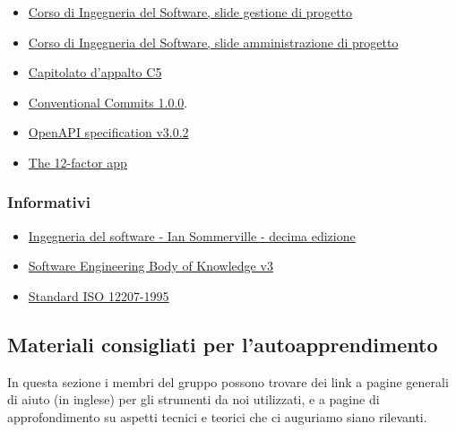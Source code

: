 \documentclass[../norme-di-progetto.tex]{subfiles}
\begin{document}
\begin{itemize}
  \item \href{https://www.math.unipd.it/~tullio/IS-1/2019/Dispense/L06.pdf}{Corso di Ingegneria del Software, slide gestione di progetto}
  \item \href{https://www.math.unipd.it/~tullio/IS-1/2019/Dispense/FC01.pdf}{Corso di Ingegneria del Software, slide amministrazione di progetto}
  \item \href{https://www.math.unipd.it/~tullio/IS-1/2019/Progetto/C5.pdf}{Capitolato d'appalto C5}
  \item \href{https://www.conventionalcommits.org/en/v1.0.0/}{Conventional Commits 1.0.0}.
  \item \href{https://spec.openapis.org/oas/v3.0.2}{OpenAPI specification v3.0.2}
  \item \href{https://12factor.net/}{The 12-factor app}
\end{itemize}

\subsubsection{Informativi}%
\label{subs:riferimenti/informativi}

\begin{itemize}
  \item \href{https://www.pearson.it/opera/pearson/0-6424-ingegneria_del_software}{Ingegneria del software - Ian Sommerville - decima edizione}
  \item \href{https://www.computer.org/education/bodies-of-knowledge/software-engineering/v3}{Software Engineering Body of Knowledge v3}
  \item \href{https://www.math.unipd.it/~tullio/IS-1/2009/Approfondimenti/ISO_12207-1995.pdf}{Standard ISO 12207-1995}
\end{itemize}

\subsection{Materiali consigliati per l'autoapprendimento}%
\label{sub:materiali_consigliati_per_l_autoapprendimento}

In questa sezione i membri del gruppo possono trovare dei link a pagine generali di aiuto (in inglese) per gli strumenti da noi utilizzati, e a pagine di approfondimento su aspetti tecnici e teorici che ci auguriamo siano rilevanti.
\end{document}
